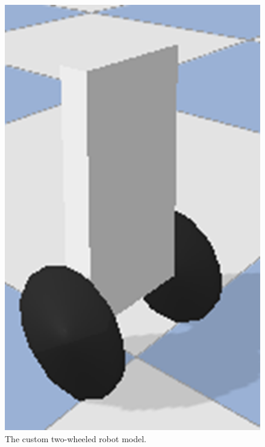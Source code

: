 \documentclass[12pt, draftclsnofoot, onecolumn]{IEEEtran}
\begin{document}
\begin{figure}[h]
    \centering
    \begin{minipage}{0.25\textwidth}
        \centering
        \includegraphics[width=\textwidth]{robot.png}
        \caption{The custom two-wheeled robot model.}
        \label{fig:robot_model}
    \end{minipage}\hfill
    \begin{minipage}{0.65\textwidth}
        \centering

\end{minipage}
\end{figure}
\end{document}
